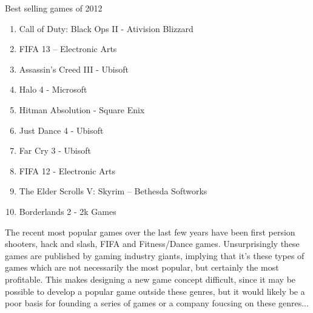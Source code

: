 Best selling games of 2012
\begin{enumerate}
  \item{Call of Duty: Black Ops II - Ativision Blizzard}
  \item{FIFA 13 – Electronic Arts}
  \item{Assassin's Creed III - Ubisoft }
  \item{Halo 4 - Microsoft}
  \item{Hitman Absolution - Square Enix}

  \item{Just Dance 4 - Ubisoft}
  \item{Far Cry 3 - Ubisoft}
  \item{FIFA 12 - Electronic Arts}
  \item{The Elder Scrolls V: Skyrim – Bethesda Softworks}
  \item{Borderlands 2 - 2k Games}
\end{enumerate}
The recent most popular games over the last few years have been first persion shooters, hack and slash, FIFA and  Fitness/Dance games. Unsurprisingly these games are published by gaming industry giants, implying that it's these types of games which are not necessarily the most popular, but certainly the most profitable. This makes designing a new game concept difficult, since it may be possible to develop a popular game outside these genres, but it would likely be a poor basis for founding a series of games or a company foucsing on these genres...

